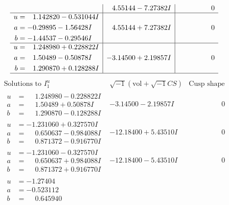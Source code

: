 \documentclass[1p]{elsarticle_modified}
\theoremstyle{definition}
\newcommand{\I}{\sqrt{-1}}
\begin{document}
$$\begin{array}{c|c|c}
 & \phantom{-}4.55144 - 7.27382 I & \phantom{-0.000000 } 0 \\ \hline\begin{aligned}
u &= \phantom{-}1.142820 - 0.531044 I \\
a &= -0.29895 - 1.56428 I \\
b &= -1.44537 - 0.29546 I\end{aligned}
 & \phantom{-}4.55144 + 7.27382 I & \phantom{-0.000000 } 0 \\ \hline\begin{aligned}
u &= \phantom{-}1.248980 + 0.228822 I \\
a &= \phantom{-}1.50489 - 0.50878 I \\
b &= \phantom{-}1.290870 + 0.128288 I\end{aligned}
 & -3.14500 + 2.19857 I & \phantom{-0.000000 } 0\\
 \hline 
 \end{array}$$\newpage$$\begin{array}{c|c|c}  
\text{Solutions to }I^u_{1}& \I (\text{vol} + \sqrt{-1}CS) & \text{Cusp shape}\\
 \hline 
\begin{aligned}
u &= \phantom{-}1.248980 - 0.228822 I \\
a &= \phantom{-}1.50489 + 0.50878 I \\
b &= \phantom{-}1.290870 - 0.128288 I\end{aligned}
 & -3.14500 - 2.19857 I & \phantom{-0.000000 } 0 \\ \hline\begin{aligned}
u &= -1.231060 + 0.327570 I \\
a &= \phantom{-}0.650637 - 0.984088 I \\
b &= \phantom{-}0.871372 - 0.916770 I\end{aligned}
 & -12.18400 + 5.43510 I & \phantom{-0.000000 } 0 \\ \hline\begin{aligned}
u &= -1.231060 - 0.327570 I \\
a &= \phantom{-}0.650637 + 0.984088 I \\
b &= \phantom{-}0.871372 + 0.916770 I\end{aligned}
 & -12.18400 - 5.43510 I & \phantom{-0.000000 } 0 \\ \hline\begin{aligned}
u &= -1.27404\phantom{ +0.000000I} \\
a &= -0.523112\phantom{ +0.000000I} \\
b &= \phantom{-}0.645940\phantom{ +0.000000I}\end{aligned}

\end{array}$$
\end{document}
